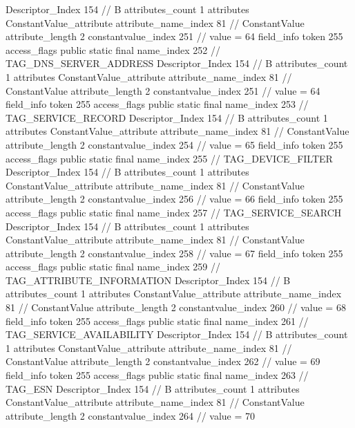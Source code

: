 {{{{{				Descriptor_Index	154		// B
				attributes_count	1
				attributes {
				ConstantValue_attribute {
					attribute_name_index	81		// ConstantValue
					attribute_length	2
					constantvalue_index	251		// value = 64
				}
				}
			}
			field_info {
				token	255
				access_flags	public static final
				name_index	252		// TAG_DNS_SERVER_ADDRESS
				Descriptor_Index	154		// B
				attributes_count	1
				attributes {
				ConstantValue_attribute {
					attribute_name_index	81		// ConstantValue
					attribute_length	2
					constantvalue_index	251		// value = 64
				}
				}
			}
			field_info {
				token	255
				access_flags	public static final
				name_index	253		// TAG_SERVICE_RECORD
				Descriptor_Index	154		// B
				attributes_count	1
				attributes {
				ConstantValue_attribute {
					attribute_name_index	81		// ConstantValue
					attribute_length	2
					constantvalue_index	254		// value = 65
				}
				}
			}
			field_info {
				token	255
				access_flags	public static final
				name_index	255		// TAG_DEVICE_FILTER
				Descriptor_Index	154		// B
				attributes_count	1
				attributes {
				ConstantValue_attribute {
					attribute_name_index	81		// ConstantValue
					attribute_length	2
					constantvalue_index	256		// value = 66
				}
				}
			}
			field_info {
				token	255
				access_flags	public static final
				name_index	257		// TAG_SERVICE_SEARCH
				Descriptor_Index	154		// B
				attributes_count	1
				attributes {
				ConstantValue_attribute {
					attribute_name_index	81		// ConstantValue
					attribute_length	2
					constantvalue_index	258		// value = 67
				}
				}
			}
			field_info {
				token	255
				access_flags	public static final
				name_index	259		// TAG_ATTRIBUTE_INFORMATION
				Descriptor_Index	154		// B
				attributes_count	1
				attributes {
				ConstantValue_attribute {
					attribute_name_index	81		// ConstantValue
					attribute_length	2
					constantvalue_index	260		// value = 68
				}
				}
			}
			field_info {
				token	255
				access_flags	public static final
				name_index	261		// TAG_SERVICE_AVAILABILITY
				Descriptor_Index	154		// B
				attributes_count	1
				attributes {
				ConstantValue_attribute {
					attribute_name_index	81		// ConstantValue
					attribute_length	2
					constantvalue_index	262		// value = 69
				}
				}
			}
			field_info {
				token	255
				access_flags	public static final
				name_index	263		// TAG_ESN
				Descriptor_Index	154		// B
				attributes_count	1
				attributes {
				ConstantValue_attribute {
					attribute_name_index	81		// ConstantValue
					attribute_length	2
					constantvalue_index	264		// value = 70
}}}}}}}
